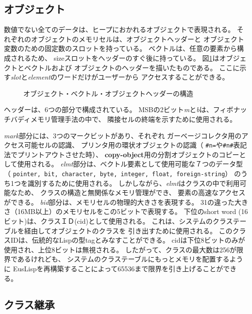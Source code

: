 \subsection{オブジェクト}
数値でない全てのデータは、ヒープにおかれるオブジェクトで表現される。
それぞれのオブジェクトのメモリセルは、オブジェクトヘッダーと
オブジェクト変数のための固定数のスロットを持っている。
ベクトルは、任意の要素から構成されるため、
sizeスロットをヘッダーのすぐ後に持っている。
図\ref{ObjectFig}はオブジェクトとベクトルおよび
オブジェクトのヘッダーを描いたものである。
ここに示す{\em slot}と{\em element}のワードだけがユーザーから
アクセスすることができる。


\begin{figure}[hbt]
\begin{center}
\end{center}
\caption{\label{ObjectFig}オブジェクト・ベクトル・オブジェクトヘッダーの構造}
\end{figure}

ヘッダーは、6つの部分で構成されている。
MSBの2ビット{\em m}と{\em b}は、フィボナッチバディメモリ管理手法の中で、
隣接セルの終端を示すために使用される。

{\em mark}部分には、3つのマークビットがあり、それぞれ
ガーベージコレクタ用のアクセス可能セルの認識、
プリンタ用の環状オブジェクトの認識（
{\tt \#n=}や{\tt \#n\#}表記法でプリントアウトさせた時）、
{\bf copy-object}用の分割オブジェクトのコピーとして使用される。
{\em elmt}部分は、ベクトル要素として使用可能な７つのデータ型（
{\tt pointer, bit, character, byte, integer, float, foreign-string}）
のうち1つを識別するために使用される。
しかしながら、{\em elmt}はクラスの中で利用可能なため、
クラスの構造と無関係なメモリ管理ができ、
要素の高速なアクセスができる。
{\em bid}部分は、メモリセルの物理的大きさを表現する。
31の違った大きさ（16MB以上）のメモリセルをこの5ビットで表現する。
下位のshort word (16ビット)は、クラスＩＤ(cid)として使用される。
これは、システムのクラステーブルを経由してオブジェクトのクラスを
引き出すために使用される。
このクラスIDは、伝統的なLispの型tagとみなすことができる。
cidは下位8ビットのみが使用され、上位8ビットは無視される。
したがって、クラスの最大数は256が限界であるけれども、
システムのクラステーブルにもっとメモリを配置するように
EusLispを再構築することによって65536まで限界を引き上げることができる。

\subsection{クラス継承}

